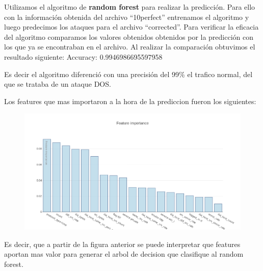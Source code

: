 \documentclass[a4paper,10pt]{article}
\begin{document}
\medskip

Utilizamos el algoritmo de \textbf{random forest} para realizar la predicción. Para ello con la información obtenida del archivo “10perfect” entrenamos el algoritmo y luego predecimos los ataques para el archivo “corrected”. Para verificar la eficacia del algoritmo comparamos los valores obtenidos obtenidos por la predicción con los que ya se encontraban en el archivo. Al realizar la comparación obtuvimos el resultado siguiente:
\medskip
\Large Accuracy: 0.9946986695597958


\medskip

\normalsize Es decir el algoritmo diferenció con una precisión del 99\% el trafico normal, del que se trataba de un ataque DOS.


Los features que mas importaron a la hora de la prediccion fueron los siguientes:
\begin{figure}[!hbp]
\centering
\includegraphics[scale=0.4]{Wireshark/newplot(5).png} 
\caption{}
\end{figure}

Es decir, que a partir de la figura anterior se puede interpretar que features aportan mas valor para generar el arbol de decision que clasifique al random forest.
\end{document}
